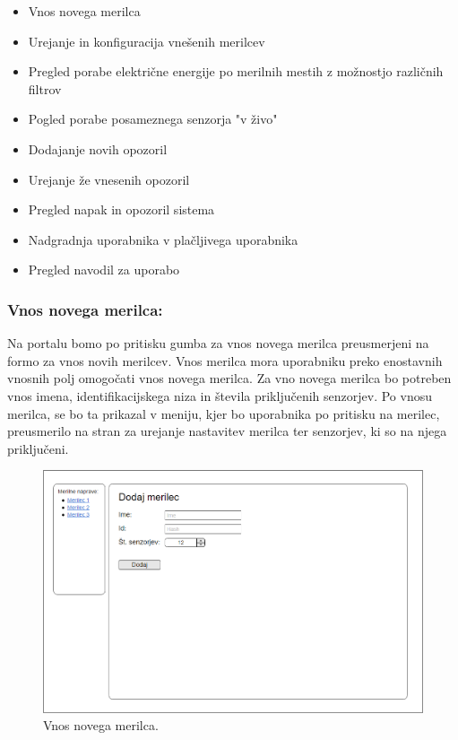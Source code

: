 \documentclass[12pt,a4paper,titlepage,openany]{report}
\begin{document}
\begin{itemize}
\item Vnos novega merilca
\item Urejanje in konfiguracija vnešenih merilcev
\item Pregled porabe električne energije po merilnih mestih z možnostjo različnih filtrov
\item Pogled porabe posameznega senzorja "v živo"
\item Dodajanje novih opozoril
\item Urejanje že vnesenih opozoril
\item Pregled napak in opozoril sistema
\item Nadgradnja uporabnika v plačljivega uporabnika
\item Pregled navodil za uporabo
\end{itemize}

\subsubsection{Vnos novega merilca:}
Na portalu bomo po pritisku gumba za vnos novega merilca preusmerjeni na formo za vnos novih merilcev. Vnos merilca mora uporabniku preko enostavnih vnosnih polj omogočati vnos novega merilca. Za vno novega merilca bo potreben vnos imena, identifikacijskega niza in števila priključenih senzorjev. Po vnosu merilca, se bo ta prikazal v meniju, kjer bo uporabnika po pritisku na merilec, preusmerilo na stran za urejanje nastavitev merilca ter senzorjev, ki so na njega priključeni.

\begin{figure}[H]
\begin{center}
\includegraphics[width=1\linewidth]{Slike/VnosNovegaMerilca.png}
\end{center}
\caption{Vnos novega merilca.}\label{slika:VnosNovegaMerilca}
\end{figure}
\end{document}
